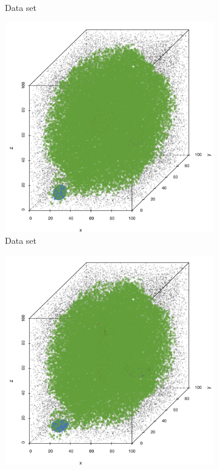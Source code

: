 \begin{figure}
\begin{subfigure}{0.23\textwidth}
				\caption{Data set \baakmanTwo}
				\label{fig:discussion:performance:mbeLowerError:baakman2}
			\end{subfigure}	
			\begin{subfigure}{0.23\textwidth}
				\centering
				\includegraphics[keepaspectratio=true, width=\textwidth, height=0.23\textheight]{discussion/img/ferdosi_3_abs_error_mbeSmallerThansambe}
				\caption{Data set \ferdosiThree}
				\label{fig:discussion:performance:mbeLowerError:ferdosi3}
			\end{subfigure}
			\begin{subfigure}{0.23\textwidth}
				\centering
				\includegraphics[keepaspectratio=true, width=\textwidth, height=0.23\textheight]{discussion/img/baakman_3_abs_error_mbeSmallerThansambe}

\end{subfigure}
\end{figure}
